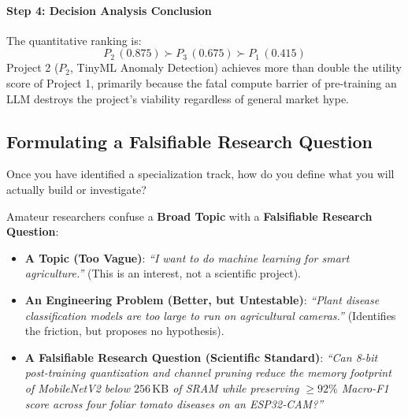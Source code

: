 \begin{example}
\paragraph{Step 4: Decision Analysis Conclusion}
The quantitative ranking is:
\begin{equation*}
P_2 \, (0.875) \succ P_3 \, (0.675) \succ P_1 \, (0.415)
\end{equation*}
Project 2 ($P_2$, TinyML Anomaly Detection) achieves more than double the utility score of Project 1, primarily because the fatal compute barrier of pre-training an LLM destroys the project's viability regardless of general market hype.
\end{example}

\subsection{Formulating a Falsifiable Research Question}\label{subsec:research_question}

Once you have identified a specialization track, how do you define what you will actually build or investigate?

Amateur researchers confuse a \textbf{Broad Topic} with a \textbf{Falsifiable Research Question}:
\begin{itemize}
    \item \textbf{A Topic (Too Vague)}: \emph{``I want to do machine learning for smart agriculture.''} (This is an interest, not a scientific project).
    \item \textbf{An Engineering Problem (Better, but Untestable)}: \emph{``Plant disease classification models are too large to run on agricultural cameras.''} (Identifies the friction, but proposes no hypothesis).
    \item \textbf{A Falsifiable Research Question (Scientific Standard)}: \emph{``Can 8-bit post-training quantization and channel pruning reduce the memory footprint of MobileNetV2 below $256\,\text{KB}$ of SRAM while preserving $\ge 92\%$ Macro-F1 score across four foliar tomato diseases on an ESP32-CAM?''}
\end{itemize}

